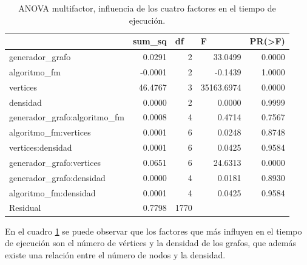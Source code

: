 \documentclass{article}
\begin{document}
\begin{table}[htbp]
  \centering
  \caption{ANOVA multifactor, influencia de los cuatro factores en el tiempo de ejecución.}
    \begin{tabular}{lrrrr}
    \toprule
          & \multicolumn{1}{l}{\textbf{sum\_sq}} & \multicolumn{1}{l}{\textbf{df}} & \multicolumn{1}{l}{\textbf{F}} & \multicolumn{1}{l}{\textbf{PR(>F)}} \\
    \midrule
    generador\_grafo & 0.0291 & 2     & 33.0499 & 0.0000 \\
    algoritmo\_fm & -0.0001 & 2     & -0.1439 & 1.0000 \\
    vertices & 46.4767 & 3     & 35163.6974 & 0.0000 \\
    densidad & 0.0000 & 2     & 0.0000 & 0.9999 \\
    generador\_grafo:algoritmo\_fm & 0.0008 & 4     & 0.4714 & 0.7567 \\
    algoritmo\_fm:vertices & 0.0001 & 6     & 0.0248 & 0.8748 \\
    vertices:densidad & 0.0001 & 6     & 0.0425 & 0.9584 \\
    generador\_grafo:vertices & 0.0651 & 6     & 24.6313 & 0.0000 \\
    generador\_grafo:densidad & 0.0000 & 4     & 0.0181 & 0.8930 \\
    algoritmo\_fm:densidad & 0.0001 & 4     & 0.0425 & 0.9584 \\
    Residual & 0.7798 & 1770  &       &  \\
    \bottomrule
    \end{tabular}%
  \label{tab:t7}%
\end{table}%
En el cuadro \ref{tab:t7} se puede observar que los factores que más influyen en el tiempo de ejecución son el número de vértices y la densidad de los grafos, que además existe una relación entre el número de nodos y la densidad. 

\newpage


\end{document}
